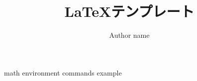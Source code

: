 \documentclass[a4paper,11pt]{ltjreport}
\title{\LaTeX テンプレート}
\author{Author name}
\date{\the\year}
\begin{document}
\maketitle

{math}
{environment}
{commands}
{example}
\end{document}
